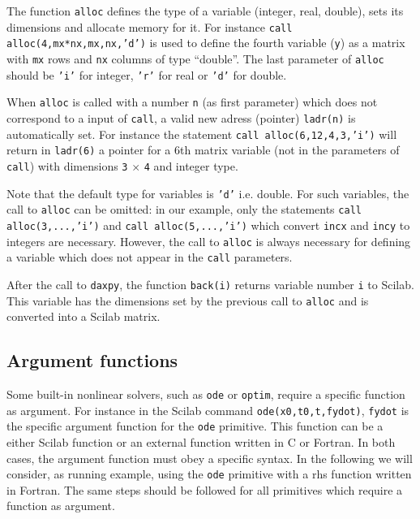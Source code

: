 The function {\tt alloc} defines the type of a variable (integer,
real, double), sets its
dimensions and allocate memory for it. 
For instance {\tt call alloc(4,mx*nx,mx,nx,'d')} is used to define
the fourth variable ({\tt y}) as a matrix with {\tt mx} rows and {\tt nx}
columns of type ``double''.
The last parameter of {\tt alloc} should be {\tt 'i'} for integer, 
{\tt 'r'} for real or {\tt 'd'} for double.


 When {\tt alloc} is called with a number {\tt n} 
(as first parameter) which does not correspond to a input of {\tt call},
a valid new adress (pointer) {\tt ladr(n)} is automatically set.
For instance the statement {\tt call alloc(6,12,4,3,'i')} will 
return in {\tt ladr(6)}  a pointer for a 6th matrix variable (not in the 
parameters of {\tt call}) with dimensions
{\tt 3} $\times$ {\tt 4} and integer type.

Note that the default type for variables is {\tt 'd'} i.e. double.
For such variables, the call to {\tt alloc} can be omitted: in our example,
only the statements {\tt call alloc(3,...,'i')} 
and {\tt call alloc(5,...,'i')} which convert {\tt incx} and 
{\tt incy} to integers are necessary. However, the call to 
{\tt alloc} is always necessary for defining a variable which does not 
appear in the {\tt call} parameters.

After the call to {\tt daxpy}, the function {\tt back(i)} returns 
variable number {\tt i} to Scilab. This variable has the dimensions
set by the previous call to {\tt alloc} and is converted into a Scilab
matrix.

\subsection{Argument functions}
Some built-in nonlinear solvers, such as {\tt ode} or {\tt optim}, require a 
specific function as argument. For instance in the Scilab command
{\tt ode(x0,t0,t,fydot)}, {\tt fydot} is the specific argument function
for the {\tt ode} primitive.
This function can be a either Scilab function or an external
function written in C or Fortran.
In both cases, the argument function must obey a specific
syntax. In the following we will consider, as running example, using 
the {\tt ode} primitive with a rhs function written in Fortran. The
same steps should be followed for all primitives which require
a function as argument.

